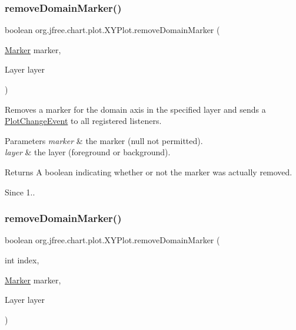 \subsubsection{\texorpdfstring{remove\+Domain\+Marker()}{removeDomainMarker()}\hspace{0.1cm}{\footnotesize\ttfamily [2/4]}}
{\footnotesize\ttfamily boolean org.\+jfree.\+chart.\+plot.\+X\+Y\+Plot.\+remove\+Domain\+Marker (\begin{DoxyParamCaption}\item[{\mbox{\hyperlink{classorg_1_1jfree_1_1chart_1_1plot_1_1_marker}{Marker}}}]{marker,  }\item[{Layer}]{layer }\end{DoxyParamCaption})}

Removes a marker for the domain axis in the specified layer and sends a \mbox{\hyperlink{}{Plot\+Change\+Event}} to all registered listeners.


\begin{DoxyParams}{Parameters}
{\em marker} & the marker ({\ttfamily null} not permitted). \\
\hline
{\em layer} & the layer (foreground or background).\\
\hline
\end{DoxyParams}
\begin{DoxyReturn}{Returns}
A boolean indicating whether or not the marker was actually removed.
\end{DoxyReturn}
\begin{DoxySince}{Since}
1.. 
\end{DoxySince}
\mbox{\label{classorg_1_1jfree_1_1chart_1_1plot_1_1_x_y_plot_ae43a099e06fde57a74dd5f5916d3ccda}} 
\subsubsection{\texorpdfstring{remove\+Domain\+Marker()}{removeDomainMarker()}\hspace{0.1cm}{\footnotesize\ttfamily [3/4]}}
{\footnotesize\ttfamily boolean org.\+jfree.\+chart.\+plot.\+X\+Y\+Plot.\+remove\+Domain\+Marker (\begin{DoxyParamCaption}\item[{int}]{index,  }\item[{\mbox{\hyperlink{classorg_1_1jfree_1_1chart_1_1plot_1_1_marker}{Marker}}}]{marker,  }\item[{Layer}]{layer }\end{DoxyParamCaption})}

